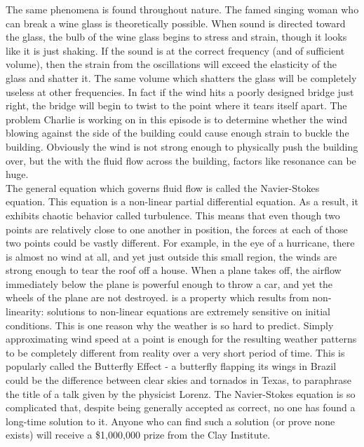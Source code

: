 The same phenomena is found throughout nature. The famed singing woman who can break a wine glass is theoretically possible. When sound is directed toward the glass, the bulb of the wine glass begins to stress and strain, though it looks like it is just shaking. If the sound is at the correct frequency (and of sufficient volume), then the strain from the oscillations will exceed the elasticity of the glass and shatter it. The same volume which shatters the glass will be completely useless at other frequencies.  In fact if the wind hits a poorly designed bridge just right, the bridge will begin to twist to the point where it tears itself apart. The problem Charlie is working on in this episode is to determine whether the wind blowing against the side of the building could cause enough strain to buckle the building. Obviously the wind is not strong enough to physically push the building over, but the with the fluid flow across the building, factors like resonance can be huge. \\

The general equation which governs fluid flow is called the Navier-Stokes equation. This equation is a non-linear partial differential equation. As a result, it exhibits chaotic behavior called turbulence. This means that even though two points are relatively close to one another in position, the forces at each of those two points could be vastly different. For example, in the eye of a hurricane, there is almost no wind at all, and yet just outside this small region, the winds are strong enough to tear the roof off a house.  When a plane takes off, the airflow immediately below the plane is powerful enough to throw a car, and yet the wheels of the plane are not destroyed.  is a property which results from non-linearity: solutions to non-linear equations are extremely sensitive on initial conditions. This is one reason why the weather is so hard to predict. Simply approximating wind speed at a point is enough for the resulting weather patterns to be completely different from reality over a very short period of time. This is popularly called the Butterfly Effect - a butterfly flapping its wings in Brazil could be the difference between clear skies and tornados in Texas, to paraphrase the title of a talk given by the physicist Lorenz. The Navier-Stokes equation is so complicated that, despite being generally accepted as correct, no one has found a long-time solution to it. Anyone who can find such a solution (or prove none exists) will receive a \$1,000,000 prize from the Clay Institute. \\

